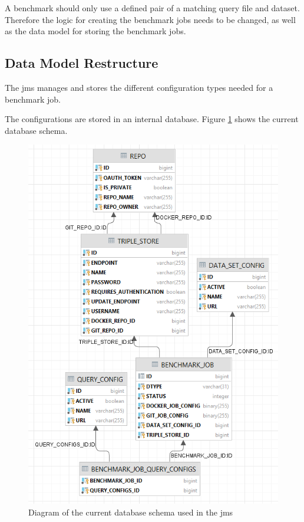A benchmark should only use a defined pair of a matching query file and dataset.
Therefore the logic for creating the benchmark jobs needs to be changed, as well as the data model for storing the benchmark jobs.


\subsection{Data Model Restructure}
\label{sec:review_data_model}
The \ac{jms} manages and stores the different configuration types needed for a benchmark job.

The configurations are stored in an internal database.
Figure \ref{fig:jms_db_schema} shows the current database schema.

\begin{figure}[tbph]
	\centering
	\includegraphics[width=.7\textwidth]{figures/jms_db_schema.png}
	\caption{Diagram of the current database schema used in the \ac{jms}}
	\label{fig:jms_db_schema}
\end{figure}

